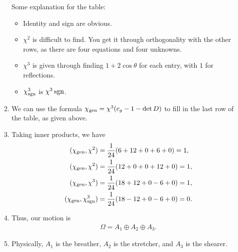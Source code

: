 \documentclass[11pt]{article}
\begin{document}
\begin{eexample}
\begin{enumerate}
\begin{table}[H]
\begin{tabular}{|c|c|c|c|c|c|}
            \end{tabular}
        \end{table}
        Some explanation for the table:
        \begin{itemize}
            \item Identity and sign are obvious.
            \item $\chi^2$ is difficult to find. You get it through orthogonality
            with the other rows, as there are four equations and four unknowns.
            \item $\chi^3$ is given through finding $1 + 2\cos{\theta}$ for each
            entry, with $1$ for reflections.
            \item $\chi^3_{\rm sgn}$ is $\chi^3 \, {\rm sgn}$.
        \end{itemize}
        \item We can use the formula $\chi_{\rm gen} = \chi^3 (c_g - 1 - \det{D})$
        to fill in the last row of the table, as given above.
        \item Taking inner products, we have
        \begin{align*}
            (\chi_{\rm gen}, \chi^2) & = \frac{1}{24} (6 + 12 + 0 + 6 + 0) = 1,\\
            (\chi_{\rm gen}, \chi^2) & = \frac{1}{24} (12 + 0 + 0 + 12 + 0) = 1,\\
            (\chi_{\rm gen}, \chi^3) & = \frac{1}{24} (18 + 12 + 0 - 6 + 0) = 1,\\
            (\chi_{\rm gen}, \chi^3_{\rm sgn}) & = \frac{1}{24} (18 - 12 + 0 - 6 + 0) = 0.
        \end{align*}
        \item Thus, our motion is
        \begin{align*}
            \boxed{\Omega = A_1 \oplus A_2 \oplus A_3.}
        \end{align*}
        \item Physically, $A_1$ is the breather, $A_2$ is the stretcher,
        and $A_3$ is the shearer.
    \end{enumerate}
\end{eexample}

\begin{eexample}
\end{eexample}

\begin{eexample}
\end{eexample}

\begin{eexample}
\end{eexample}


\end{document}
